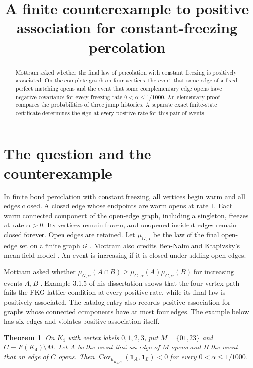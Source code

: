 \documentclass[11pt,a4paper]{amsart}
\title[Positive association in constant-freezing percolation]{A finite counterexample to positive association for constant-freezing percolation}
\date{}
\newtheorem{theorem}{Theorem}
\DeclareMathOperator{\Cov}{Cov}
\begin{document}
\begin{abstract}
Mottram asked whether the final law of percolation with constant freezing is positively associated. On the complete graph on four vertices, the event that some edge of a fixed perfect matching opens and the event that some complementary edge opens have negative covariance for every freezing rate \(0<\alpha\leq 1/1000\). An elementary proof compares the probabilities of three jump histories. A separate exact finite-state certificate determines the sign at every positive rate for this pair of events.
\end{abstract}
\maketitle

\section{The question and the counterexample}
In finite bond percolation with constant freezing, all vertices begin warm and all edges closed. A closed edge whose endpoints are warm opens at rate \(1\). Each warm connected component of the open-edge graph, including a singleton, freezes at rate \(\alpha>0\). Its vertices remain frozen, and unopened incident edges remain closed forever. Open edges are retained. Let \(\mu_{G,\alpha}\) be the law of the final open-edge set on a finite graph \(G\) \cite[Definition 3.2.1]{mottram-thesis}. Mottram also credits Ben-Naim and Krapivsky's mean-field model \cite{mottram-paper,bennaim-krapivsky}. An event is increasing if it is closed under adding open edges.

Mottram asked whether \(\mu_{G,\alpha}(A\cap B)\geq \mu_{G,\alpha}(A)\mu_{G,\alpha}(B)\) for increasing events \(A,B\) \cite[\S3.1.4]{mottram-thesis}. Example 3.1.5 of his dissertation shows that the four-vertex path fails the FKG lattice condition at every positive rate, while its final law is positively associated. The catalog entry \cite{catalog} also records positive association for graphs whose connected components have at most four edges. The example below has six edges and violates positive association itself.

\begin{theorem}\label{counterexample}
On \(K_4\) with vertex labels \(0,1,2,3\), put \(M=\{01,23\}\) and \(C=E(K_4)\setminus M\). Let \(A\) be the event that an edge of \(M\) opens and \(B\) the event that an edge of \(C\) opens. Then
\(\Cov_{\mu_{K_4,\alpha}}(\mathbf{1}_A,\mathbf{1}_B)<0\)
for every \(0<\alpha\leq 1/1000\).
\end{theorem}
\end{document}
